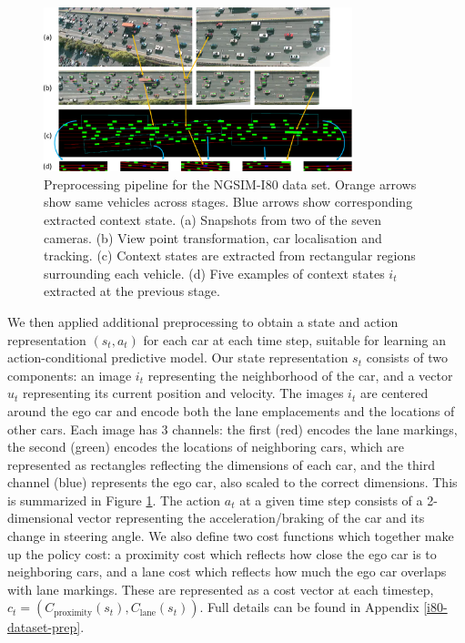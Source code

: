 \documentclass{article} %
\begin{document}
\begin{figure}[t]
  \centering
  \includegraphics[width=0.8\textwidth]{figures/driving/I-80-blue-crop.pdf}
  \caption{
    Preprocessing pipeline for the NGSIM-I80 data set.
    Orange arrows show same vehicles across stages.
    Blue arrows show corresponding extracted context state.
    (a) Snapshots from two of the seven cameras.
    (b) View point transformation, car localisation and tracking.
    (c) Context states are extracted from rectangular regions surrounding each vehicle.
    (d) Five examples of context states $i_t$ extracted at the previous stage.
  }
\label{I-80}
\end{figure}


We then applied additional preprocessing to obtain a state and action representation $(s_t, a_t)$ for each car at each time step, suitable for learning an action-conditional predictive model.
Our state representation $s_t$ consists of two components: an image $i_t$ representing the neighborhood of the car, and a vector $u_t$ representing its current position and velocity.
The images $i_t$ are centered around the ego car and encode both the lane emplacements and the locations of other cars.
Each image has 3 channels: the first (red) encodes the lane markings, the second (green) encodes the locations of neighboring cars, which are represented as rectangles reflecting the dimensions of each car, and the third channel (blue) represents the ego car, also scaled to the correct dimensions.
This is summarized in Figure \ref{I-80}. The action $a_t$ at a given time step consists of a 2-dimensional vector representing the acceleration/braking of the car and its change in steering angle.
We also define two cost functions which together make up the policy cost: a proximity cost which reflects how close the ego car is to neighboring cars, and a lane cost which reflects how much the ego car overlaps with lane markings. These are represented as a cost vector at each timestep, $c_t = (C_{\text{proximity}}(s_t), C_{\text{lane}}(s_t))$. Full details can be found in Appendix \ref{i80-dataset-prep}.
\end{document}

